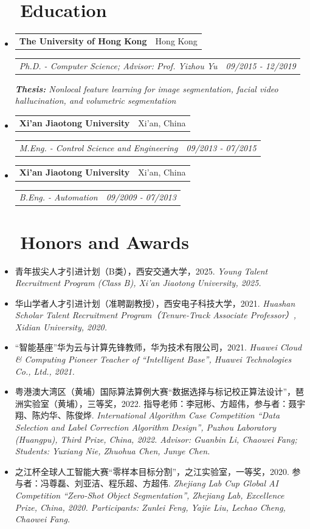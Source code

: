 \documentclass[a4paper,36pt]{article}
\makeatletter
\newcommand{\chn}[1]{#1}
\newcommand{\resumeItemWithoutTitle}[1]{
  \item\justifying\small{
    {#1 \vspace{-2pt}}
  }
}
\newcommand{\resumeSubheading}[2]{
  \item
    \begin{tabular*}{0.97\textwidth}{l@{\extracolsep{\fill}}r}
      \textbf{#1} & #2 \\
    \end{tabular*}%
}
\newcommand{\resumeSubheadingWithoutItem}[2]{
    \begin{tabular*}{0.97\textwidth}{l@{\extracolsep{\fill}}r}
      \textit{#1} & \textit{#2} \\
    \end{tabular*}
}
\newcommand{\resumeSubHeadingListStart}{\begin{itemize}[leftmargin=*]}
\newcommand{\resumeSubHeadingListEnd}{\end{itemize}}
\makeatother
\begin{document}
\section{~~Education}
  \resumeSubHeadingListStart
    \resumeSubheading{The University of Hong Kong}{Hong Kong}
    \resumeSubheadingWithoutItem{Ph.D. - Computer Science; Advisor: Prof. Yizhou Yu }{09/2015 - 12/2019} \vspace{-12pt}
    {\textit{ \newline{}\textbf{Thesis:} Nonlocal feature learning for image segmentation, facial video hallucination, and volumetric segmentation}}
    \resumeSubheading{Xi'an Jiaotong University}{Xi'an, China}
    \resumeSubheadingWithoutItem{M.Eng. - Control Science and Engineering}{09/2013 - 07/2015}
    \resumeSubheading{Xi'an Jiaotong University}{Xi'an, China}
    \resumeSubheadingWithoutItem{B.Eng. - Automation}{09/2009 - 07/2013}
  \resumeSubHeadingListEnd
\vspace{1pt}

\section{~~Honors and Awards}
\resumeSubHeadingListStart
\resumeItemWithoutTitle{\chn{青年拔尖人才引进计划（B类），西安交通大学，2025.} \textit{Young Talent Recruitment Program (Class B), Xi'an Jiaotong University, 2025.}}
\resumeItemWithoutTitle{\chn{华山学者人才引进计划（准聘副教授），西安电子科技大学，2021.} \textit{Huashan Scholar Talent Recruitment Program（Tenure-Track Associate Professor）, Xidian University, 2020.}}
\resumeItemWithoutTitle{\chn{``智能基座''华为云与计算先锋教师，华为技术有限公司，2021.} \textit{Huawei Cloud \& Computing Pioneer Teacher of ``Intelligent Base'', Huawei Technologies Co., Ltd., 2021.}}
\resumeItemWithoutTitle{\chn{粤港澳大湾区（黄埔）国际算法算例大赛``数据选择与标记校正算法设计''，琶洲实验室（黄埔），三等奖，2022. 指导老师：李冠彬、方超伟，参与者：聂宇翔、陈灼华、陈俊烨.} \textit{International Algorithm Case Competition ``Data Selection and Label Correction Algorithm Design'', Puzhou Laboratory (Huangpu), Third Prize, China, 2022. Advisor: Guanbin Li, Chaowei Fang; Students: Yuxiang Nie, Zhuohua Chen, Junye Chen.}}
\resumeItemWithoutTitle{\chn{之江杯全球人工智能大赛``零样本目标分割''，之江实验室，一等奖，2020. 参与者：冯尊磊、刘亚洁、程乐超、方超伟.} \textit{Zhejiang Lab Cup Global AI Competition ``Zero-Shot Object Segmentation'', Zhejiang Lab, Excellence Prize, China, 2020. Participants: Zunlei Feng, Yajie Liu, Lechao Cheng, Chaowei Fang.}}
\resumeSubHeadingListEnd
\vspace{1pt}
\end{document}
